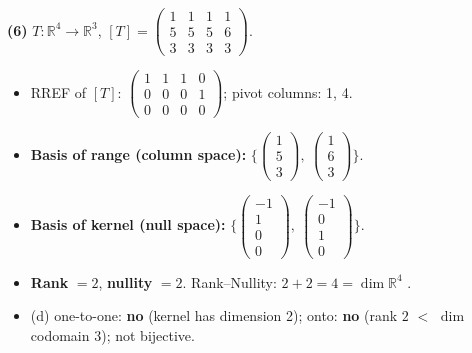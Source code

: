 \noindent\textbf{(6)} $T:\mathbb{R}^4\to\mathbb{R}^3$, $[T]=\begin{pmatrix}1 & 1 & 1 & 1 \\ 5 & 5 & 5 & 6 \\ 3 & 3 & 3 & 3\end{pmatrix}$.
\begin{itemize}
\item RREF of $[T]$: $\begin{pmatrix}1 & 1 & 1 & 0 \\ 0 & 0 & 0 & 1 \\ 0 & 0 & 0 & 0\end{pmatrix}$; pivot columns: 1, 4.
\item \textbf{Basis of range (column space):} $\Big\{\begin{pmatrix}1 \\ 5 \\ 3\end{pmatrix},\ \begin{pmatrix}1 \\ 6 \\ 3\end{pmatrix}\Big\}$.
\item \textbf{Basis of kernel (null space):} $\Big\{\begin{pmatrix}-1 \\ 1 \\ 0 \\ 0\end{pmatrix},\ \begin{pmatrix}-1 \\ 0 \\ 1 \\ 0\end{pmatrix}\Big\}$.
\item \textbf{Rank} $=2$, \textbf{nullity} $=2$. Rank--Nullity: $2+2=4=\dim\mathbb{R}^4$ \checkmark.
\item (d) one-to-one: \textbf{no} (kernel has dimension 2); onto: \textbf{no} (rank $2$ $<$ $\dim$ codomain $3$); not bijective.
\end{itemize}

